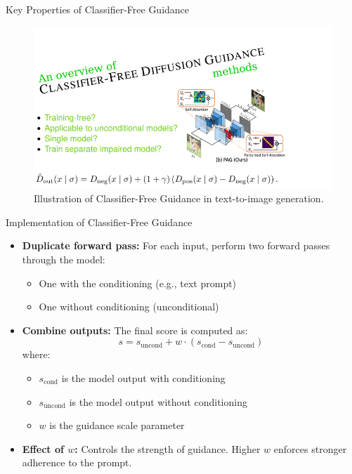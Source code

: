 \begin{frame}[allowframebreaks]{Key Properties of Classifier-Free Guidance}
    \begin{figure}
        \centering
        \includegraphics[width=\linewidth,height=0.8\textheight,keepaspectratio]{images/vision+text/classifier-free-guidance-2.png}
        \caption*{Illustration of Classifier-Free Guidance in text-to-image generation.}
    \end{figure}
\end{frame}


\begin{frame}[fragile]{Implementation of Classifier-Free Guidance}
    \begin{itemize}
        \item \textbf{Duplicate forward pass:} For each input, perform two forward passes through the model:
        \begin{itemize}
            \item One with the conditioning (e.g., text prompt)
            \item One without conditioning (unconditional)
        \end{itemize}
        \item \textbf{Combine outputs:} The final score is computed as:
        \[
            s = s_{\text{uncond}} + w \cdot (s_{\text{cond}} - s_{\text{uncond}})
        \]
        where:
        \begin{itemize}
            \item $s_{\text{cond}}$ is the model output with conditioning
            \item $s_{\text{uncond}}$ is the model output without conditioning
            \item $w$ is the guidance scale parameter
        \end{itemize}
        \item \textbf{Effect of $w$:} Controls the strength of guidance. Higher $w$ enforces stronger adherence to the prompt.
    \end{itemize}
\end{frame}


